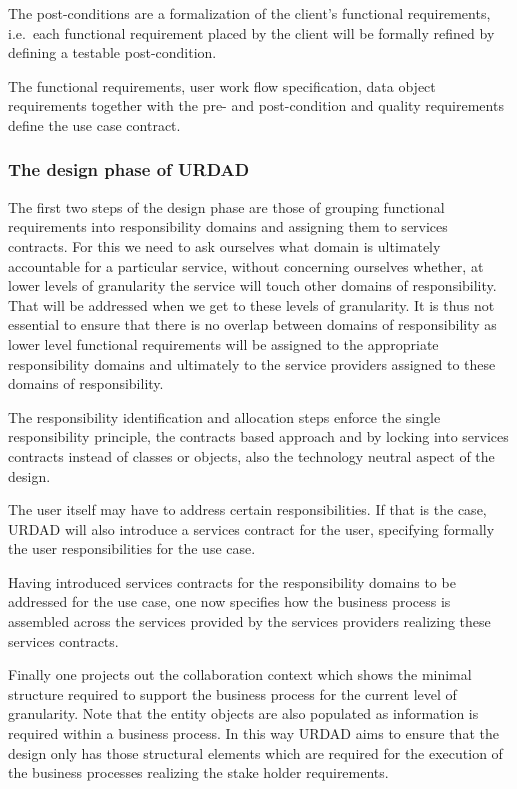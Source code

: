 \documentclass[reviewcopy]{elsart}
\begin{document}
The post-conditions are a formalization of the client's functional requirements,
i.e.\ each functional requirement placed by the client will be formally refined
by defining a testable post-condition.

The functional requirements, user work flow specification, data object requirements
together with the pre- and post-condition and quality requirements define the
use case contract.


\subsubsection{The design phase of URDAD}

The first two steps of the design phase are those of grouping functional
requirements into responsibility domains and assigning them to services
contracts. For this we need to ask ourselves what domain is ultimately
accountable for a particular service, without concerning ourselves whether,
at lower levels of granularity the service will touch other domains of
responsibility. That will be addressed when we get to these levels of
granularity. It is thus not essential to ensure that
there is no overlap between domains of responsibility as
lower level functional requirements will be assigned to the appropriate responsibility
domains and ultimately to the service providers assigned to these domains of responsibility.


The responsibility identification and allocation steps enforce the single responsibility principle, the
contracts based approach and by locking into services contracts instead of
classes or objects, also the technology neutral aspect of the design.


The user itself may have to address certain responsibilities. If that is the
case, URDAD will also introduce a services contract for the user, specifying
formally the user responsibilities for the use case.

Having introduced services contracts for the responsibility domains to
be addressed for the use case, one now specifies how the business process is
assembled across the services provided by the services providers realizing these
services contracts.

Finally one projects out the collaboration context which shows the minimal structure
required to support the business process for the current level of granularity. Note
that the entity objects are also populated as information is required within a business
process. In this way URDAD aims to ensure that the design only has those structural
elements which are required for the execution of the business processes realizing the
stake holder requirements.
\end{document}
